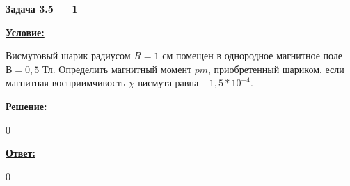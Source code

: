 
\begin{center}
    \textbf{Задача 3.5 --- 1}
\end{center}

\underline{\textbf{Условие:}}

Висмутовый шарик радиусом 
$ R = 1 $ см помещен в однородное магнитное поле 
$ В = 0,5 $ Тл. Определить магнитный момент 
$ pm $, приобретенный шариком, 
если магнитная восприимчивость $ \chi $ висмута равна 
$ -1,5 * 10^{-4} $.

\underline{\textbf{Решение:}}

0

\underline{\textbf{Ответ:}}

0
